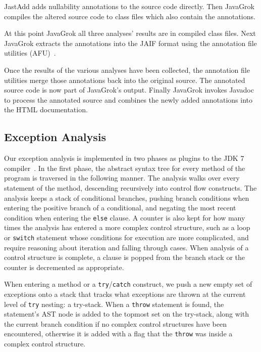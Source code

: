 JastAdd adds nullability 
annotations to the source code directly. Then JavaGrok compiles the 
altered source code to class files which also contain the annotations.

At this point JavaGrok all three analyses' results are in compiled class files.
Next JavaGrok extracts the annotations into the JAIF 
format using the annotation file utilities (AFU)~\cite{AFU}.

Once the results of the various analyses have been collected, the annotation file utilities merge
those annotations back into the original source. The annotated source
code is now part of JavaGrok's output. Finally JavaGrok invokes 
Javadoc to process the annotated source and combines the newly added 
annotations into the HTML documentation.

\subsection{Exception Analysis}
\label{sec:exception_impl}
Our exception analysis is implemented in two phases as plugins to the JDK 7
compiler~\cite{AFU,pluggable}.
In the first phase, the
abstract syntax tree for every method of the program is traversed in the
following manner.  The analysis walks over every statement of the method,
descending recursively into control flow constructs.  The analysis keeps a stack
of conditional branches, pushing branch conditions when entering the positive
branch of a conditional, and negating the most recent condition when entering
the \texttt{else} clause.  A counter is also kept for how many times the
analysis has entered a more complex control structure, such as a loop or
\texttt{switch} statement whose conditions for execution are more complicated,
and require reasoning about iteration and falling through cases.  When
analysis of a control structure is complete, a clause is popped from the
branch stack or the counter is decremented as appropriate.

When entering a method or a \texttt{try}/\texttt{catch} construct, we push a new empty set of exceptions onto
a stack that tracks what exceptions are thrown at the current level of
\texttt{try} nesting: a try-stack.
When a \texttt{throw} statement is found, the statement's AST node is added to the
topmost set on the try-stack, 
along with the current branch condition if no complex control structures have
been encountered, otherwise it is added with a flag that the \texttt{throw} was inside a
complex control structure.

